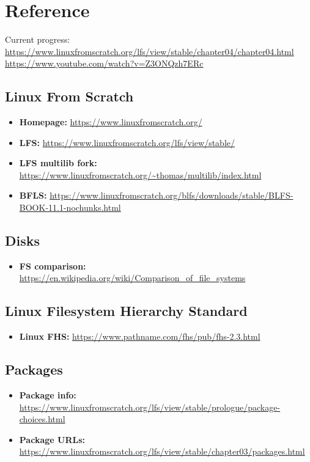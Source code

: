 \documentclass[10pt, a4paper, onecolumn, oneside, titlepage, openany]{book}
\begin{document}
\chapter{Reference}
Current progress:
\newline \url{https://www.linuxfromscratch.org/lfs/view/stable/chapter04/chapter04.html}
\newline \url{https://www.youtube.com/watch?v=Z3ONQzh7ERc}
\section{Linux From Scratch}
\begin{itemize}
    \item \textbf{Homepage:} \url{https://www.linuxfromscratch.org/}
    \item \textbf{LFS:} \url{https://www.linuxfromscratch.org/lfs/view/stable/}
    \item \textbf{LFS multilib fork:} \url{https://www.linuxfromscratch.org/~thomas/multilib/index.html}
    \item \textbf{BFLS:} \url{https://www.linuxfromscratch.org/blfs/downloads/stable/BLFS-BOOK-11.1-nochunks.html}
\end{itemize}

\section{Disks}
\begin{itemize}
    \item \textbf{FS comparison:} \url{https://en.wikipedia.org/wiki/Comparison_of_file_systems}
\end{itemize}

\section{Linux Filesystem Hierarchy Standard}
\begin{itemize}
    \item \textbf{Linux FHS:} \url{https://www.pathname.com/fhs/pub/fhs-2.3.html}
\end{itemize}

\section{Packages}
\begin{itemize}
    \item \textbf{Package info:} \url{https://www.linuxfromscratch.org/lfs/view/stable/prologue/package-choices.html}
    \item \textbf{Package URLs:} \url{https://www.linuxfromscratch.org/lfs/view/stable/chapter03/packages.html}
\end{itemize}
\end{document}
